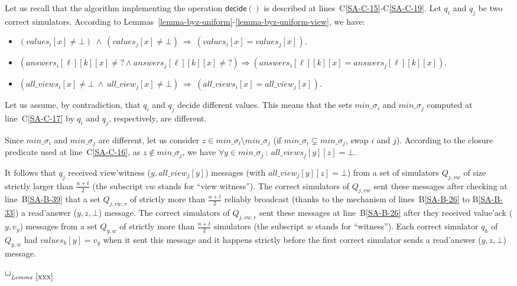 \documentclass[11pt,letterpaper]{article}
\newlength {\afterproof}
\newcommand{\toto}{xxx}
\newenvironment{proofL}{\noindent{\bf Proof }}
{\hspace*{\fill}$\Box_{\mathit{Lemma}~\ref{\toto}}$\par\vspace{\afterproof}}
\begin{document}
\begin{proofL}
Let us recall that the algorithm implementing the operation 
$\mathsf{decide}()$
is described at lines~C\ref{SA-C-15}-C\ref{SA-C-19}.
Let $q_i$ and $q_j$ be two correct simulators.
According  to  Lemmas~\ref{lemma-byz-uniform}-\ref{lemma-byz-uniform-view},
we have:
\begin{itemize}
\vspace{-0.2cm}
\item $(values_i[x]\neq \bot) ~\wedge~(values_j[x]\neq \bot)
      ~\Rightarrow~(values_i[x]=values_j[x])$.
\vspace{-0.2cm} 
\item $(answers_i[\ell][k][x]\neq?\land answers_j[\ell][k][x]\neq?)
      \Rightarrow(answers_i[\ell][k][x]=answers_j[\ell][k][x])$.
\vspace{-0.2cm} 
\item $(all\_views_i[x]\neq \bot ~\wedge~ all\_view_j[x]\neq \bot)
      ~\Rightarrow~(all\_views_i[x]=all\_view_j[x])$.
\end{itemize}  
 
Let us assume, by contradiction, that $q_i$ and $q_j$
decide different values. This means that the sets  $min\_\sigma_i$ and
 $min\_\sigma_j$ computed at line~C\ref{SA-C-17} by   $q_i$  and  $q_j$,
respectively,  are different.

Since $min\_\sigma_i$ and $min\_\sigma_j$ are different,
let us consider $z\in min\_\sigma_i\setminus min\_\sigma_j$
(if $min\_\sigma_i \subsetneq min\_\sigma_j$,  swap $i$ and $j$).
According to the closure predicate used at line~C\ref{SA-C-16},
as $z\notin min\_\sigma_j$,
we have  $\forall y\in min\_\sigma_j~:~all\_views_j[y][z]=\bot$.

It  follows  that $q_j$  received  {\sc view'witness}  ($y,all\_view_j[y]$)
messages  (with $all\_view_j[y][z]=\bot$)
from  a  set  of  simulators   $Q_{j,vw}$  of  size  strictly  larger  than
$\frac{n+t}{2}$ (the subscript $vw$ stands for ``view witness'').
The correct simulators  of $Q_{j,vw}$ sent these messages  after checking at
line~B\ref{SA-B-39} that
a set $Q_{j,vw,r}$ of strictly more than $\frac{n+t}{2}$ reliably broadcast
(thanks to the mechanism of lines~B\ref{SA-B-26} to B\ref{SA-B-33})
a {\sc read'answer} ($y,z,\bot$) message.
The   correct   simulators  of   $Q_{j,vw,r}$   sent   these  messages   at
line~B\ref{SA-B-26} after they  received  {\sc value'ack} ($y,v_y$) messages
from a set $Q_{y,w}$ of strictly more than $\frac{n+t}{2}$ simulators
 (the subscript $w$ stands for ``witness'').
Each  correct simulator $q_k$  of $Q_{y,w}$  had $values_k[y]=v_y$  when it
sent this message and it happens
strictly  before the  first  correct simulator  sends  a {\sc  read'answer}
($y,z,\bot$) message.


\end{proofL}
\end{document}
